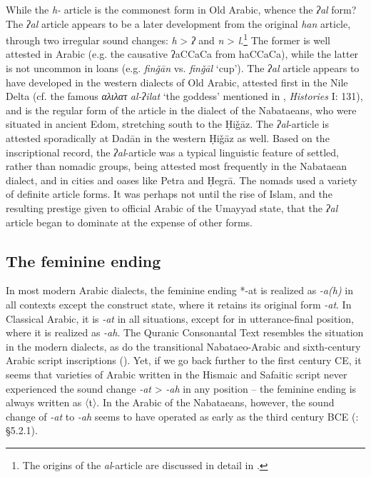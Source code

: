 \documentclass[output=paper]{langsci/langscibook}
\begin{document}
While the \textit{h-} article is the commonest form in Old Arabic, whence the \textit{ʔal} form? The \textit{ʔal} article appears to be a later development from the original \textit{han} article, through two irregular sound changes: \textit{h} > \textit{ʔ} and \textit{n} > \textit{l}.\footnote{The origins of the \textit{al}-article are discussed in detail in \citep{Al-Jalladforthcoming}.} The former is well attested in Arabic (e.g. the causative ʔaCCaCa from haCCaCa), while the latter is not uncommon in loans (e.g. \textit{finǧān} vs. \textit{finǧāl} ‘cup’). The \textit{ʔal} article appears to have developed in the western dialects of Old Arabic, attested first in the Nile Delta (cf. the famous \textit{αλιλατ} \textit{al-ʔilat} ‘the goddess’ mentioned in , \textit{Histories} I: 131), and is the regular form of the article in the dialect of the Nabataeans, who were situated in ancient Edom, stretching south to the Ḥiǧāz. The \textit{ʔal}-article is attested sporadically at Dadān in the western Ḥiǧāz as well. Based on the inscriptional record, the \textit{ʔal}-article was a typical linguistic feature of settled, rather than nomadic groups, being attested most frequently in the Nabataean dialect, and in cities and oases like Petra and Ḥegrā. The nomads used a variety of definite article forms. It was perhaps not until the rise of Islam, and the resulting prestige given to official Arabic of the Umayyad state, that the \textit{ʔal} article began to dominate at the expense of other forms.

\subsection{The feminine ending}
In most modern Arabic dialects, the feminine ending *-at is realized as \textit{-a(h)} in all contexts except the construct state, where it retains its original form \textit{-at}. In Classical Arabic, it is \textit{-at} in all situations, except for in utterance-final position, where it is realized as \textit{-ah}. The Quranic Consonantal Text resembles the situation in the modern dialects, as do the transitional Nabataeo-Arabic and sixth-century Arabic script inscriptions (\citealt{Nehmé2017}). Yet, if we go back further to the first century CE, it seems that varieties of Arabic written in the Hismaic and Safaitic script never experienced the sound change \textit{-at} > \textit{-ah} in any position – the feminine ending is always written as 〈t〉. In the Arabic of the Nabataeans, however, the sound change of \textit{-at} to \textit{-ah} seems to have operated as early as the third century BCE (\citealt{Al-Jallad2017early}: §5.2.1). 
\end{document}
